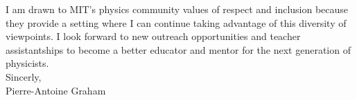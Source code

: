 \documentclass[12pt]{article}
\begin{document}
I am drawn to MIT's physics community values of respect and inclusion because they provide a setting where I can continue taking advantage of this diversity of viewpoints. I look forward to new outreach opportunities and teacher assistantships to become a better educator and mentor for the next generation of physicists.\\


Sincerly, \\

Pierre-Antoine Graham
\end{document}
